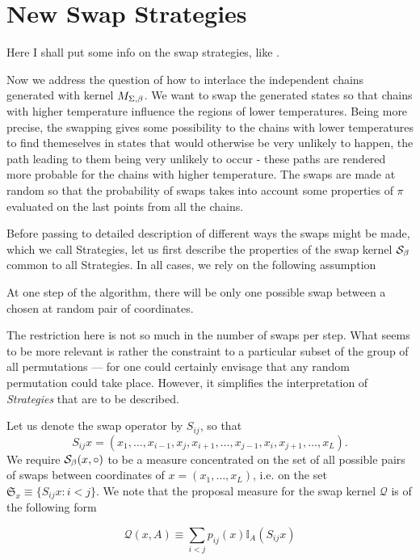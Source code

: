 \section{New Swap Strategies}

Here I shall put some info on the swap strategies, like \cite{DavidRomer, DaviddeLaCroix}.

Now we address the question of how to interlace the independent chains generated with kernel $M_{\Sigma,\beta}$. We want to swap the generated states so that chains with higher temperature influence the regions of lower temperatures. Being more precise, the swapping gives some possibility to the chains with lower temperatures to find themeselves in states that would otherwise be very unlikely to happen, the path leading to them being very unlikely to occur - these paths are rendered more probable for the chains with higher temperature. The swaps are made at random so that the probability of swaps takes into account some properties of $\pi$ evaluated on the last points from all the chains. 

Before passing to detailed description of different ways the swaps might be made, which we call Strategies, let us first describe the properties of the swap kernel $\mathcal{S}_{\beta}$ common to all Strategies. In all cases, we rely on the following assumption

\begin{assumptions}
	\item At one step of the algorithm, there will be only one possible swap between a chosen at random pair of coordinates.
\end{assumptions}

The restriction here is not so much in the number of swaps per step. What seems to be more relevant is rather the constraint to a particular subset of the group of all permutations --- for one could certainly envisage that any random permutation could take place. However, it simplifies the interpretation of {\it Strategies} that are to be described. 

Let us denote the swap operator by $S_{ij}$, so that 
$$S_{ij} x = (x_1, \dots, x_{i-1}, x_j, x_{i+1}, \dots, x_{j-1}, x_i, x_{j+1}, \dots, x_L).$$ 
We require $\mathcal{S}_{\beta}(x, \circ )$ to be a measure concentrated on the set of all possible pairs of swaps between coordinates of $x = (x_1, \dots, x_L)$, i.e. on the set $\mathfrak{S}_x \equiv \{ S_{ij}x : i < j  \}$. We note that the proposal measure for the swap kernel $\mathcal{Q}$ is of the following form 

\begin{equation*}
	\mathcal{Q}(x, A) \equiv \underset{i < j}{\sum} p_{ij}(x) \mathbb{I}_A (S_{ij} x)
\end{equation*}	 

